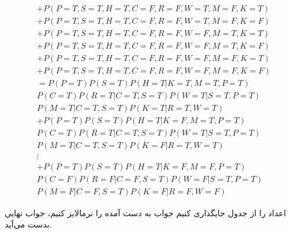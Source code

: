 \documentclass{university}
\begin{document}
\begin{gather*}
    + P(P=T, S=T, H=T, C=F, R=F, W=T, M=F, K=T) \\
    + P(P=T, S=T, H=T, C=F, R=F, W=T, M=F, K=F) \\
    + P(P=T, S=T, H=T, C=F, R=F, W=F, M=T, K=T) \\
    + P(P=T, S=T, H=T, C=F, R=F, W=F, M=T, K=F) \\
    + P(P=T, S=T, H=T, C=F, R=F, W=F, M=F, K=T) \\
    + P(P=T, S=T, H=T, C=F, R=F, W=F, M=F, K=F) \\
    = P(P=T) P(S=T) P(H=T|K=T, M=T, P=T)\\ P(C=T) P(R=T|C=T, S=T) P(W=T|S=T, P=T)\\ P(M=T|C=T, S=T) P(K=T|R=T, W=T) \\
    + P(P=T) P(S=T) P(H=T|K=F, M=T, P=T)\\ P(C=T) P(R=T|C=T, S=T) P(W=T|S=T, P=T)\\ P(M=T|C=T, S=T) P(K=F|R=T, W=T) \\
    \vdots \\
    + P(P=T) P(S=T) P(H=T|K=F, M=F, P=T)\\ P(C=F) P(R=F|C=F, S=T) P(W=F|S=T, P=T)\\ P(M=F|C=F, S=T) P(K=F|R=F, W=F) 
\end{gather*} 

اعداد را از جدول جایگذاری کنیم جواب به دست آمده را نرمالایز کنیم، جواب نهایی بدست می‌آید.
\end{document}
